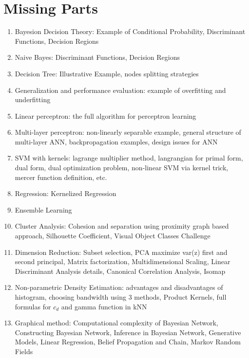 \chapter{Missing Parts}

\begin{enumerate}
    \item Bayesion Decision Theory: Example of Conditional Probability, Discriminant Functions, Decision Regions
    \item Naive Bayes: Discriminant Functions, Decision Regions
    \item Decision Tree: Illustrative Example, nodes splitting strategies
    \item Generalization and performance evaluation: example of overfitting and underfitting 
    \item Linear perceptron: the full algorithm for perceptron learning
    \item Multi-layer perceptron: non-linearly separable example, general structure of multi-layer ANN, backpropagation examples, design issues for ANN
    \item SVM with kernels: lagrange multiplier method, langrangian for primal form, dual form, dual optimization problem, non-linear SVM via kernel trick, mercer function definition, etc.
    \item Regression: Kernelized Regression
    \item Ensemble Learning
    \item Cluster Analysis: Cohesion and separation using proximity graph based approach, Silhouette Coefficient, Visual Object Classes Challenge
    \item Dimension Reduction: Subset selection, PCA maximize var(z) first and second principal, Matrix factorization, Multidimensional Scaling, Linear Discriminant Analysis details, Canonical Correlation Analysis, Isomap
    \item Non-parametric Density Estimation: advantages and disadvantages of histogram, choosing bandwidth using 3 methods, Product Kernels, full formulas for $c_d$ and gamma function in kNN
    \item Graphical method: Computational complexity of Bayesian Network, Constructing Bayesian Network, Inference in Bayesian Network, Generative Models, Linear Regression, Belief Propagation and Chain, Markov Random Fields
\end{enumerate}